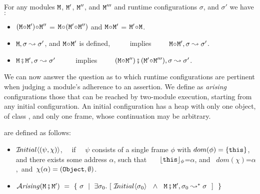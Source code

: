 \begin{lemma}
 For any modules $\M$,   $\M'$, $\M''$, and $\M'''$ and runtime configurations $\sigma$, and $\sigma'$ we have$:$
 \label{lemma:linking:properties}

 \begin{itemize}
     \item
     $(\M \link \M')\link \M''$ = $\M \link (\M' \link \M'')$  \hspace{1cm} and    \hspace{1cm}   $\M \link \M'$  = $\M' \link\M$.
      \item
      $\M, \sigma \leadsto \sigma'$, and $\M\link \M'$ is defined, \  \ \ \ \  implies\ \ \ \ \   $\M\link \M', \sigma \leadsto \sigma'$.
 \item
 $\M \mkpair \M', \sigma \leadsto \sigma'$   \  \ \ \ \  implies\ \ \ \ \  $(\M\link\M'') \mkpair (\M'\link\M''') ,\sigma \leadsto \sigma'$.  
  \end{itemize}

 \end{lemma}
 
 We can now answer the question as to which runtime configurations are pertinent when judging a module's
adherence to an assertion.
We define as  {\em arising} configurations those that can be reached by two-module execution, starting from any initial configuration.
An initial configuration has a heap with only one object, of class , and only one frame, whose continuation may be arbitrary.
 
\begin{definition} are defined as follows: \label{defn:iniial-and-arising}

\begin{itemize}
     \item
   $\Initial {(\psi,\chi)}$, \ \ if \ \ $\psi$ consists of a single frame $\phi$ with $dom(\phi)=\{ \this \}$, and there exists  some address $\alpha$, such that \ \ \    $\interp {\this}{\phi}$=$\alpha$, and \ $dom(\chi)$=$\alpha$,\  and\  
    $\chi(\alpha)=(\prg{Object},\emptyset)$.
 \item
 $\Arising  {\M\mkpair\M'} \ = \ \{ \ \sigma \ \mid \ \exists \sigma_0. \ [\  \Initial{\sigma_0} \  \ \wedge\ \  \M\mkpair\M', \sigma_0 \leadsto^* \sigma \ \ ] \ \ \} $
 \end{itemize}

\end{definition}

 


